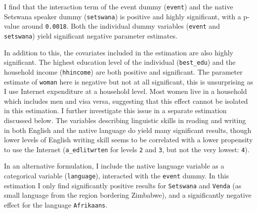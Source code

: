 \documentclass[a4paper,british]{article}\usepackage[]{graphicx}\usepackage[]{xcolor}
\providecommand*{\code}[1]{\texttt{#1}}
\begin{document}
I find that the interaction term of the event dummy (\code{event})
and the native Setswana speaker dummy (\code{setswana}) is positive
and highly significant, with a p-value around \code{0.0018}. Both
the individual dummy variables (\code{event} and \code{setswana})
yield significant negative parameter estimates.

In addition to this, the covariates included in the estimation are
also highly significant. The highest education level of the individual
(\code{best\_edu}) and the household income (\code{hhincome}) are
both positive and significant. The parameter estimate of \code{woman}
here is negative but not at all significant, this is unsurprising
as I use Internet expenditure at a household level. Most women live
in a household which includes men and visa versa, suggesting that
this effect cannot be isolated in this estimation. I further investigate
this issue in a separate estimation discussed below. The variables
describing linguistic skills in reading and writing in both English
and the native language do yield many significant results, though
lower levels of English writing skill seems to be correlated with
a lower propensity to use the Internet (\code{a\_edlitwrten} for
levels \code{2} and \code{3}, but not the very lowest: \code{4}).

In an alternative formulation, I include the native language variable
as a categorical variable (\code{language}), interacted with the
\code{event} dummy. In this estimation I only find significantly
positive results for \code{Setswana} and \code{Venda} (as small
language from the region bordering Zimbabwe), and a significantly
negative effect for the language \code{Afrikaans}.
\end{document}
